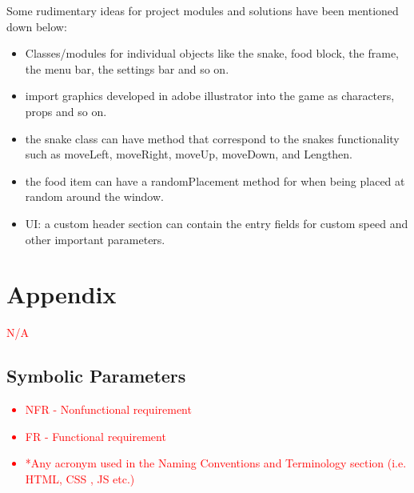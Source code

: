 \documentclass[12pt, titlepage]{article}
\begin{document}
Some rudimentary ideas for project modules and solutions have been mentioned down below:
\begin{itemize}
\item Classes/modules for individual objects like the snake, food block, the frame, the menu bar, the settings bar and so on.
\item import graphics developed in adobe illustrator into the game as characters, props and so on.
\item the snake class can have method that correspond to the snakes functionality such as moveLeft, moveRight, moveUp, moveDown, and Lengthen.
\item the food item can have a randomPlacement method for when being placed at random around the window.
\item UI: a custom header section can contain the entry fields for custom speed and other important parameters.
\end{itemize}




\newpage

\section{Appendix}

\textcolor{red}{N/A}

\subsection{Symbolic Parameters}

\textcolor{red}{
\begin{itemize}
\item NFR - Nonfunctional requirement
\item FR - Functional requirement
\item *Any acronym used in the Naming Conventions and Terminology section (i.e. HTML, CSS , JS etc.)
\end{itemize}
}
\end{document}
